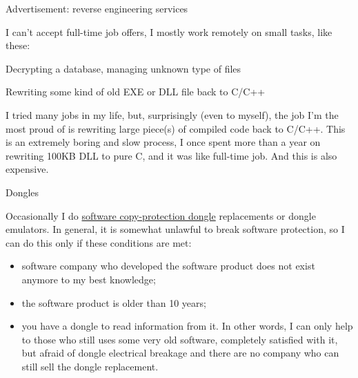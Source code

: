 \vspace*{\fill}

\iffalse
\large \textbf{Subscribe to news about my other articles and blog posts:}

\bigskip

\begin{itemize}

\item \url{https://twitter.com/yurichev}

\item \url{https://www.facebook.com/dennis.yurichev.5}

\end{itemize}

\bigskip
\fi
\huge Advertisement: reverse engineering services
\normalsize

\bigskip
\bigskip

I can't accept full-time job offers, I mostly work remotely on small tasks, like these:

\large Decrypting a database, managing unknown type of files \normalsize


\large Rewriting some kind of old EXE or DLL file back to C/C++ \normalsize

I tried many jobs in my life, but, surprisingly (even to myself),
the job I'm the most proud of is rewriting large piece(s) of compiled code back to C/C++.
This is an extremely boring and slow process, I once spent more than a year on rewriting 100KB DLL to pure C,
and it was like full-time job.
And this is also expensive.

\large Dongles \normalsize

Occasionally I do \href{https://en.wikipedia.org/wiki/Software_protection_dongle}{software copy-protection dongle} replacements or dongle emulators. In general, it is somewhat unlawful to break software protection, so I can do this only if these conditions are met:

\begin{itemize}
\item software company who developed the software product does not exist anymore to my best knowledge;
\item the software product is older than 10 years;
\item you have a dongle to read information from it. In other words, I can only help to those who still uses some very old software, completely satisfied with it, but afraid of dongle electrical breakage and there are no company who can still sell the dongle replacement.
\end{itemize}

